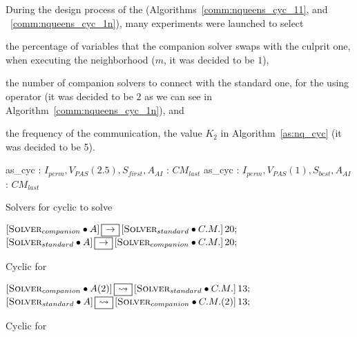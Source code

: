 During the design process of the \commstrs{} (Algorithms~\ref{comm:nqueens_cyc_11}, and ~\ref{comm:nqueens_cyc_1n}), many experiments were launched to select \begin{inparaenum} \item the percentage of variables that the companion solver swaps with the culprit one, when executing the neighborhood \om{} ($m$, it was decided to be $1$), \item the number of companion solvers to connect with the standard one, for the \commstr{} using operator \oneTn{} (it was decided to be $2$ as we can see in Algorithm~\ref{comm:nqueens_cyc_1n}), and \item the frequency of the communication, \ie the value $K_2$ in Algorithm~\ref{as:nq_cyc} (it was decided to be 5). \end{inparaenum} 

\begin{algorithm}[h]
\dontprintsemicolon
\SetNoline
{}
   as\_cyc\;
\algoindent {} : $I_{perm}, V_{PAS}(2.5), S_{first}, A_{AI}$ \;
\algoindent {}: $CM_{last}$\;
   as\_cyc\;
\algoindent {} : $I_{perm}, V_{PAS}(1), S_{best}, A_{AI}$ \;
\algoindent {}: $CM_{last}$\;
\caption{Solvers for cyclic \commstr{} to solve \NQP{}}\label{as:nq_cyc}
\end{algorithm}

\begin{algorithm}[H]
\dontprintsemicolon
\SetNoline
$\left[\eqsolverposl{companion}\posldot A\right] \onetoone \left[\eqsolverposl{standard}\posldot C.M.\right]20;$\;
$\left[\eqsolverposl{standard}\posldot A\right] \onetoone \left[\eqsolverposl{companion}\posldot C.M.\right]20;$
\caption{Cyclic \commstr{} \oneTone{} for \NQP}\label{comm:nqueens_cyc_11}
\end{algorithm}

\begin{algorithm}[h]
\dontprintsemicolon
\SetNoline
$\left[\eqsolverposl{companion}\posldot A(2)\right] \oneton \left[\eqsolverposl{standard}\posldot C.M.\right]13;$\;
$\left[\eqsolverposl{standard}\posldot A\right] \oneton \left[\eqsolverposl{companion}\posldot C.M.(2)\right]13;$
\caption{Cyclic \commstr{} \oneTn{} for \NQP}\label{comm:nqueens_cyc_1n}
\end{algorithm}

